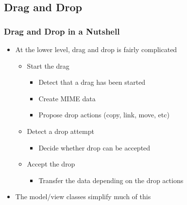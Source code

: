 %
%
%
%

\subsection{Drag and Drop}

\begin{slide}
\frametitle{Drag and Drop in a Nutshell}
  \begin{itemize}
  \item At the lower level, drag and drop is fairly complicated
    \begin{itemize}
    \item Start the drag
      \begin{itemize}
      \item Detect that a drag has been started
      \item Create MIME data
      \item Propose drop actions (copy, link, move, etc)
      \end{itemize}
    \item Detect a drop attempt
      \begin{itemize}
      \item Decide whether drop can be accepted
      \end{itemize}
    \item Accept the drop
      \begin{itemize}
      \item Transfer the data depending on the drop actions
      \end{itemize}
    \end{itemize}
  \medskip
  \item The model/view classes simplify much of this
  \end{itemize}
\end{slide}

